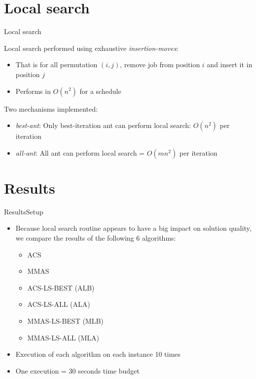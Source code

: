 \documentclass[10pt]{beamer}
\begin{document}
\section{Local search}

\begin{frame}{Local search}{}

Local search performed using exhaustive \textit{insertion-moves}:

\begin{itemize}
  \item That is for all permutation $(i, j)$, remove job from position $i$ and insert it in position $j$
  \item Performs in $O(n^2)$ for a schedule
\end{itemize}



Two mechanisms implemented:

\begin{itemize}
  \item \textit{best-ant}: Only best-iteration ant can perform local search: $O(n^2)$ per iteration
  \item \textit{all-ant}: All ant can perform local search = $O(mn^2)$ per iteration
\end{itemize}

\end{frame}

\section{Results}

\begin{frame}{Results}{Setup}

\begin{itemize}
  \item Because local search routine appears to have a big impact on solution quality, we compare the results of the following 6 algorithms:
  \begin{itemize}
    \item ACS
    \item MMAS
    \item ACS-LS-BEST (ALB)
    \item ACS-LS-ALL (ALA)
    \item MMAS-LS-BEST (MLB)
    \item MMAS-LS-ALL (MLA)
  \end{itemize}
  \item Execution of each algorithm on each instance 10 times
  \item One execution = 30 seconds time budget
\end{itemize}

\end{frame}
\end{document}
